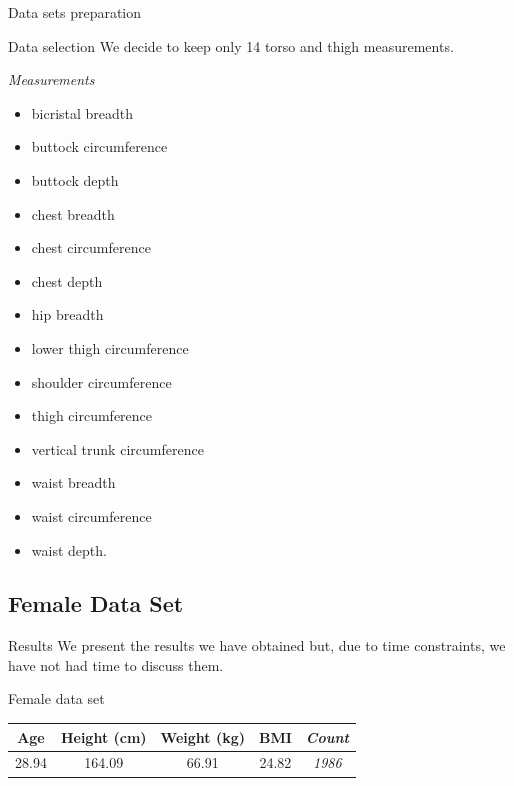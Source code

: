 \documentclass[10pt]{beamer}
\begin{document}
\begin{frame}{Data sets preparation}
	\begin{block}{Data selection}
		We decide to keep only 14 torso and thigh measurements.
	\end{block}
	\begin{exampleblock}{\centering\itshape Measurements}
		\begin{multicols}{2}
			\begin{itemize}
				\item bicristal breadth
				\item buttock circumference
				\item buttock depth
				\item chest breadth
				\item chest circumference
				\item chest depth
				\item hip breadth
				\item lower thigh circumference
				\item shoulder circumference
				\item thigh circumference
				\item vertical trunk circumference
				\item waist breadth
				\item waist circumference
				\item waist depth.
			\end{itemize}
		\end{multicols}
	\end{exampleblock}
\end{frame}

\subsection{Female Data Set}
\begin{frame}{Results}
	We present the results we have obtained but, due to time constraints, we have not had time to discuss them.
	\begin{block}{Female data set}
		\centering
		\begin{tabular}{|cccc|c|}
			\hline
			Age   & Height (cm) & Weight (kg) & BMI   & \textit{Count} \\
			\hline
			28.94 & 164.09      & 66.91       & 24.82 & \textit{1986}  \\
			\hline
		\end{tabular}
	\end{block}
\end{frame}
\end{document}
